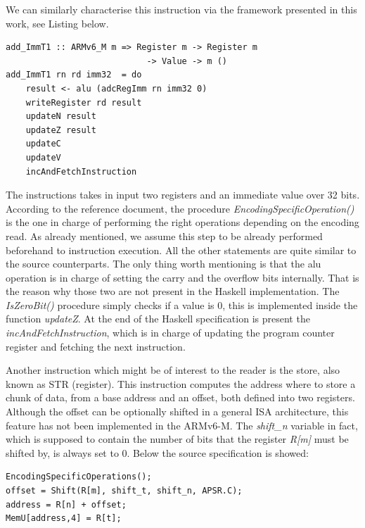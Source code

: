 \documentclass[conference]{IEEEtran}
\begin{document}
\noindent
We can similarly characterise this instruction via the framework presented in this work,
see Listing below.\\

\begin{lstlisting}[caption=ADD (immediate) instruction - Haskell-based specification,
frame=single, label=lis:addH]
add_ImmT1 :: ARMv6_M m => Register m -> Register m
							-> Value -> m ()
add_ImmT1 rn rd imm32  = do
    result <- alu (adcRegImm rn imm32 0)
    writeRegister rd result
    updateN result
    updateZ result
    updateC
    updateV
    incAndFetchInstruction
\end{lstlisting}

\noindent
The instructions takes in input two registers and an immediate value over 32 bits. According
to the reference document, the procedure \textit{EncodingSpecificOperation()} is the one in
charge of performing the right operations depending on the encoding read. As already
mentioned, we assume this step to be already performed beforehand to instruction execution.
All the other statements are quite similar to the source counterparts.
The only thing worth mentioning is that the alu operation is in charge of
setting the carry and the overflow bits internally. That is the reason why those two are not
present in the Haskell implementation. The \textit{IsZeroBit()} procedure simply checks if a
value is 0, this is implemented inside the function \textit{updateZ}. At the end of the
Haskell specification is present the \textit{incAndFetchInstruction}, which is in charge of
updating the program counter register and fetching the next instruction.

Another instruction which might be of interest to the reader is the store, also known as STR
(register). This instruction computes the address where to store a chunk of data, from a base
address and an offset, both defined into two registers. Although the offset can be optionally
shifted in a general ISA architecture, this feature has not been implemented in the ARMv6-M.
The \textit{shift\_n} variable in fact, which is supposed to contain the number of bits that
the register \textit{R[m]} must be shifted by, is always set to 0. Below the source
specification is showed:\\

\begin{lstlisting}[caption=STR (register) instruction - Reference specification,
frame=single, label=lis:str]
EncodingSpecificOperations();
offset = Shift(R[m], shift_t, shift_n, APSR.C);
address = R[n] + offset;
MemU[address,4] = R[t];
\end{lstlisting}
\end{document}
